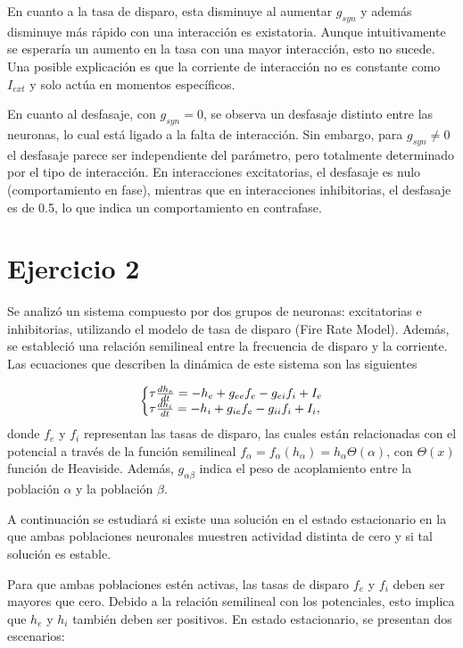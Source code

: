\documentclass[aps,prb,twocolumn,superscriptaddress,floatfix,longbibliography]{revtex4-2}
\newcounter{para}
\begin{document}
En cuanto a la tasa de disparo, esta disminuye al aumentar \(g_{syn}\) y además disminuye más rápido con una interacción es existatoria. Aunque intuitivamente se esperaría un aumento en la tasa con una mayor interacción, esto no sucede. Una posible explicación es que la corriente de interacción no es constante como $I_{ext}$ y solo actúa en momentos específicos.

En cuanto al desfasaje, con $g_{syn} = 0$, se observa un desfasaje distinto entre las neuronas, lo cual está ligado a la falta de interacción. Sin embargo, para $g_{syn} \neq 0$ el desfasaje parece ser independiente del parámetro, pero totalmente determinado por el tipo de interacción. En interacciones excitatorias, el desfasaje es nulo (comportamiento en fase), mientras que en interacciones inhibitorias, el desfasaje es de 0.5, lo que indica un comportamiento en contrafase.

\section{Ejercicio 2}


Se analizó un sistema compuesto por dos grupos de neuronas: excitatorias e inhibitorias, utilizando el modelo de tasa de disparo (Fire Rate Model). Además, se estableció una relación semilineal entre la frecuencia de disparo y la corriente. Las ecuaciones que describen la dinámica de este sistema son las siguientes

\[
\left\{\begin{array}{@{}l@{}}
    \tau \frac{dh_e}{dt} = -h_e + g_{ee} f_e - g_{ei} f_i + I_e \\
    \tau \frac{dh_i}{dt} = -h_i + g_{ie} f_e - g_{ii} f_i + I_i,
    \end{array}\right.
\]
donde $f_e$ y $f_i$ representan las tasas de disparo, las cuales están relacionadas con el potencial a través de la función semilineal $f_\alpha = f_\alpha(h_\alpha) = h_\alpha\Theta(\alpha)$, con $\Theta(x)$ función de Heaviside. Además, $g_{\alpha \beta}$ indica el peso de acoplamiento entre la población $\alpha$ y la población $\beta$.

A continuación se estudiará si existe una solución en el estado estacionario en la que ambas poblaciones neuronales muestren actividad distinta de cero y si tal solución es estable.

Para que ambas poblaciones estén activas, las tasas de disparo \(f_e\) y \(f_i\) deben ser mayores que cero. Debido a la relación semilineal con los potenciales, esto implica que \(h_e\) y \(h_i\) también deben ser positivos. En estado estacionario, se presentan dos escenarios:
\end{document}
